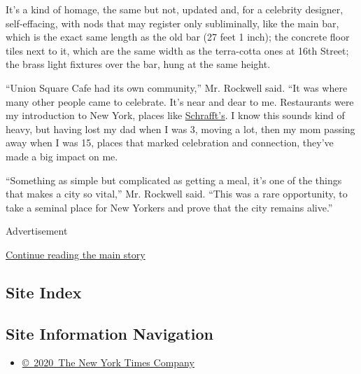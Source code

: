 It's a kind of homage, the same but not, updated and, for a celebrity
designer, self-effacing, with nods that may register only subliminally,
like the main bar, which is the exact same length as the old bar (27
feet 1 inch); the concrete floor tiles next to it, which are the same
width as the terra-cotta ones at 16th Street; the brass light fixtures
over the bar, hung at the same height.

``Union Square Cafe had its own community,'' Mr. Rockwell said. ``It was
where many other people came to celebrate. It's near and dear to me.
Restaurants were my introduction to New York, places like
\href{http://www.nytimes3xbfgragh.onion/2008/06/29/realestate/29scap.html}{Schrafft's}.
I know this sounds kind of heavy, but having lost my dad when I was 3,
moving a lot, then my mom passing away when I was 15, places that marked
celebration and connection, they've made a big impact on me.

``Something as simple but complicated as getting a meal, it's one of the
things that makes a city so vital,'' Mr. Rockwell said. ``This was a
rare opportunity, to take a seminal place for New Yorkers and prove that
the city remains alive.''

Advertisement

\protect\hyperlink{after-bottom}{Continue reading the main story}

\hypertarget{site-index}{%
\subsection{Site Index}\label{site-index}}

\hypertarget{site-information-navigation}{%
\subsection{Site Information
Navigation}\label{site-information-navigation}}

\begin{itemize}
\tightlist
\item
  \href{https://help.nytimes3xbfgragh.onion/hc/en-us/articles/115014792127-Copyright-notice}{©~2020~The
  New York Times Company}
\end{itemize}

